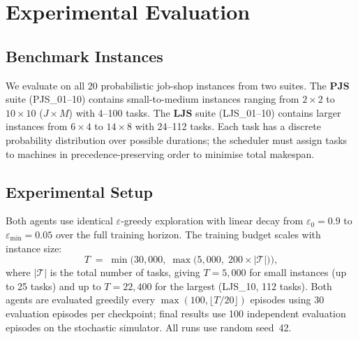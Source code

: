 %
%

\section{Experimental Evaluation}
\label{sec:experiments}


\subsection{Benchmark Instances}
\label{sec:instances}

We evaluate on all 20 probabilistic job-shop instances from two suites.
The \textbf{PJS} suite (PJS\_01--10) contains small-to-medium instances ranging
from $2{\times}2$ to $10{\times}10$ ($J{\times}M$) with 4--100 tasks.  The
\textbf{LJS} suite (LJS\_01--10) contains larger instances from $6{\times}4$ to
$14{\times}8$ with 24--112 tasks.  Each task has a discrete probability
distribution over possible durations; the scheduler must assign tasks to
machines in precedence-preserving order to minimise total makespan.


\subsection{Experimental Setup}
\label{sec:setup}

Both agents use identical $\varepsilon$-greedy exploration with linear decay
from $\varepsilon_0 = 0.9$ to $\varepsilon_{\min} = 0.05$ over the full
training horizon.  The training budget scales with instance size:
\[
  T \;=\; \min\!\bigl(30{,}000,\;\max\!\bigl(5{,}000,\;200 \times |\mathcal{T}|\bigr)\bigr),
\]
where $|\mathcal{T}|$ is the total number of tasks, giving $T = 5{,}000$ for
small instances (up to 25 tasks) and up to $T = 22{,}400$ for the largest
(LJS\_10, 112 tasks).  Both agents are evaluated greedily every
$\max(100,\lfloor T/20 \rfloor)$ episodes using 30 evaluation episodes per
checkpoint; final results use 100 independent evaluation episodes on the
stochastic simulator.  All runs use random seed~42.


